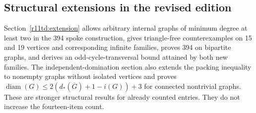 \documentclass[11pt,a4paper]{article}
\theoremstyle{definition}\newtheorem{definition}[theorem]{Definition}
\theoremstyle{remark}\newtheorem{remark}[theorem]{Remark}
\newcommand{\diam}{\operatorname{diam}}
\begin{document}
\subsection{Structural extensions in the revised edition}
Section~\ref{r11td:extension} allows arbitrary internal graphs of minimum
degree at least two in the 394 spoke construction, gives triangle-free
counterexamples on 15 and 19 vertices and corresponding infinite families,
proves 394 on bipartite graphs, and derives an odd-cycle-transversal bound
attained by both new families. The independent-domination section also
extends the packing inequality to nonempty graphs without isolated vertices
and proves $\diam(G)\leq2(d_*(\overline G)+1-i(G))+3$ for connected
nontrivial graphs. These are stronger structural results for already
counted entries. They do not increase the fourteen-item count.
\end{document}
